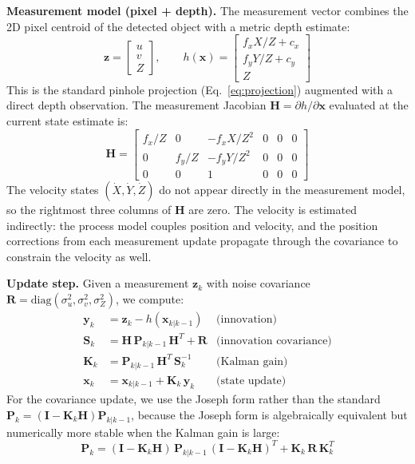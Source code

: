 \documentclass[letterpaper, 10 pt, conference]{ieeeconf}  %
\begin{document}
\textbf{Measurement model (pixel + depth).}
The measurement vector combines the 2D pixel centroid of the detected object with a metric depth estimate:
\begin{equation}
\mathbf{z} = \begin{bmatrix} u \\ v \\ Z \end{bmatrix}, \qquad
h(\mathbf{x}) = \begin{bmatrix} f_x X/Z + c_x \\ f_y Y/Z + c_y \\ Z \end{bmatrix}
\end{equation}
This is the standard pinhole projection (Eq.~\ref{eq:projection}) augmented with a direct depth observation. The measurement Jacobian $\mathbf{H} = \partial h / \partial \mathbf{x}$ evaluated at the current state estimate is:
\begin{equation}
\mathbf{H} = \begin{bmatrix}
f_x/Z & 0 & -f_x X/Z^2 & 0 & 0 & 0 \\[3pt]
0 & f_y/Z & -f_y Y/Z^2 & 0 & 0 & 0 \\[3pt]
0 & 0 & 1 & 0 & 0 & 0
\end{bmatrix}
\label{eq:jacobian}
\end{equation}
The velocity states $(\dot{X}, \dot{Y}, \dot{Z})$ do not appear directly in the measurement model, so the rightmost three columns of $\mathbf{H}$ are zero. The velocity is estimated indirectly: the process model couples position and velocity, and the position corrections from each measurement update propagate through the covariance to constrain the velocity as well.

\textbf{Update step.}
Given a measurement $\mathbf{z}_k$ with noise covariance $\mathbf{R} = \text{diag}(\sigma_u^2, \sigma_v^2, \sigma_Z^2)$, we compute:
\begin{align}
\mathbf{y}_k &= \mathbf{z}_k - h(\mathbf{x}_{k|k-1}) & \text{(innovation)} \label{eq:innovation} \\
\mathbf{S}_k &= \mathbf{H} \, \mathbf{P}_{k|k-1} \, \mathbf{H}^T + \mathbf{R} & \text{(innovation covariance)} \\
\mathbf{K}_k &= \mathbf{P}_{k|k-1} \, \mathbf{H}^T \, \mathbf{S}_k^{-1} & \text{(Kalman gain)} \\
\mathbf{x}_k &= \mathbf{x}_{k|k-1} + \mathbf{K}_k \, \mathbf{y}_k & \text{(state update)}
\end{align}
For the covariance update, we use the Joseph form rather than the standard $\mathbf{P}_k = (\mathbf{I} - \mathbf{K}_k \mathbf{H}) \mathbf{P}_{k|k-1}$, because the Joseph form is algebraically equivalent but numerically more stable when the Kalman gain is large:
\begin{equation}
\mathbf{P}_k = (\mathbf{I} - \mathbf{K}_k \mathbf{H}) \, \mathbf{P}_{k|k-1} \, (\mathbf{I} - \mathbf{K}_k \mathbf{H})^T + \mathbf{K}_k \, \mathbf{R} \, \mathbf{K}_k^T
\label{eq:joseph}
\end{equation}
\end{document}

